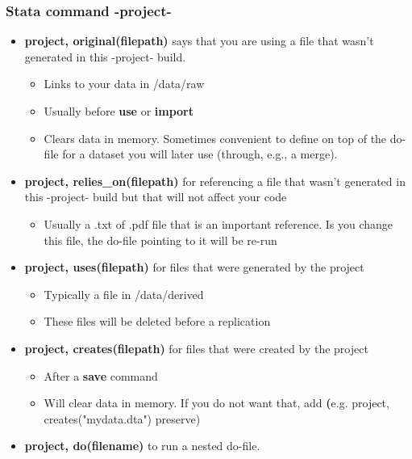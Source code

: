 \documentclass{beamer}
\begin{document}
\frame
{
	\frametitle{Stata command -project-}
	
		\begin{itemize}
			\item \textbf{project, original(filepath)} says that you are using a file that wasn't generated in this -project- build. 
			\begin{itemize}
				\item Links to your data in /data/raw
				\item Usually before \textbf{use} or \textbf{import} 
				\item Clears data in memory. Sometimes convenient to define on top of the do-file for a dataset you will later use (through, e.g., a merge). 
			\end{itemize}
		\item \textbf{project, relies\_on(filepath)} for referencing a file that wasn't generated in this -project- build but that will not affect your code 
		\begin{itemize}
			\item Usually a .txt of .pdf file that is an important reference. Is you change this file, the do-file pointing to it will be re-run
		\end{itemize}
	\item \textbf{project, uses(filepath)} for files that were generated by the project
	\begin{itemize}
		\item Typically a file in  /data/derived
		\item These files will be deleted before a replication
	\end{itemize}
	\item \textbf{project, creates(filepath)} for files that were created by the project
\begin{itemize}
	\item After a \textbf{save} command
	\item Will clear data in memory. If you do not want that, add \textbf (e.g. project, creates("mydata.dta") preserve)
	
\end{itemize}
\item \textbf{project, do(filename)}  to run a nested do-file.
		\end{itemize}	
	
}
\end{document}
